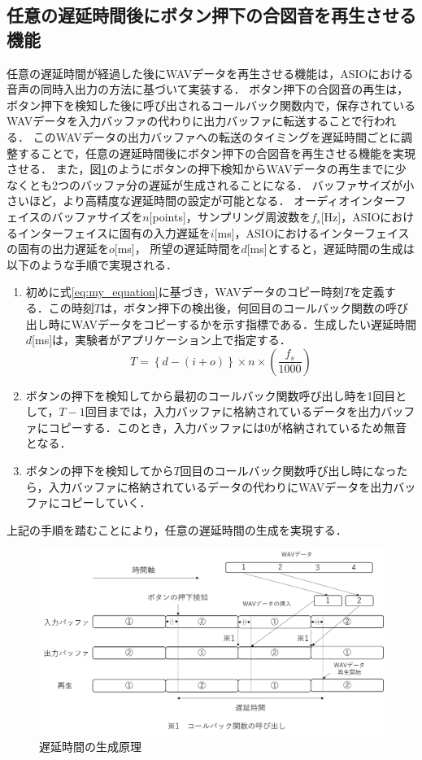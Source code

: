 \subsection{任意の遅延時間後にボタン押下の合図音を再生させる機能}
任意の遅延時間が経過した後にWAVデータを再生させる機能は，ASIOにおける音声の同時入出力の方法に基づいて実装する．
ボタン押下の合図音の再生は，ボタン押下を検知した後に呼び出されるコールバック関数内で，保存されているWAVデータを入力バッファの代わりに出力バッファに転送することで行われる．
このWAVデータの出力バッファへの転送のタイミングを遅延時間ごとに調整することで，任意の遅延時間後にボタン押下の合図音を再生させる機能を実現させる．
また，図\ref{fig:delay_theory}のようにボタンの押下検知からWAVデータの再生までに少なくとも2つのバッファ分の遅延が生成されることになる．
バッファサイズが小さいほど，より高精度な遅延時間の設定が可能となる．
オーディオインターフェイスのバッファサイズを$n$[points]，サンプリング周波数を$f_{s}$[Hz]，ASIOにおけるインターフェイスに固有の入力遅延を$i$[ms]，ASIOにおけるインターフェイスの固有の出力遅延を$o$[ms]，
所望の遅延時間を$d$[ms]とすると，遅延時間の生成は以下のような手順で実現される．
\begin{enumerate}[leftmargin=*]
  \item 初めに式\ref{eq:my_equation}に基づき，WAVデータのコピー時刻$T$を定義する．この時刻$T$は，ボタン押下の検出後，何回目のコールバック関数の呼び出し時にWAVデータをコピーするかを示す指標である．生成したい遅延時間$d$[ms]は，実験者がアプリケーション上で指定する．
\begin{equation}
T = \left\{ d - (i + o) \right\} \times n \times \left( \frac{f_s}{1000} \right) \label{eq:my_equation}
\end{equation}

  \item ボタンの押下を検知してから最初のコールバック関数呼び出し時を1回目として，$T-1$回目までは，入力バッファに格納されているデータを出力バッファにコピーする．このとき，入力バッファには0が格納されているため無音となる．
  \item ボタンの押下を検知してから$T$回目のコールバック関数呼び出し時になったら，入力バッファに格納されているデータの代わりにWAVデータを出力バッファにコピーしていく．
\end{enumerate}
上記の手順を踏むことにより，任意の遅延時間の生成を実現する．
\begin{figure}[h]
  \centering
  \includegraphics[scale=0.45]{figures/System/Delay_theory.png}
  \caption{遅延時間の生成原理}
  \label{fig:delay_theory}
\end{figure}
